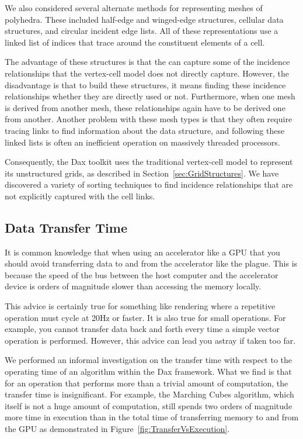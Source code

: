 We also considered several alternate methods for representing meshes of
polyhedra. These included half-edge and winged-edge
structures, cellular data
structures, and circular incident edge
lists. All of these representations use a linked list of
indices that trace around the constituent elements of a cell.

The advantage of these structures is that the can capture some of the
incidence relationships that the vertex-cell model does not directly
capture. However, the disadvantage is that to build these structures, it
means finding these incidence relationships whether they are directly used
or not. Furthermore, when one mesh is derived from another mesh, these
relationships again have to be derived one from another. Another problem
with these mesh types is that they often require tracing links to find
information about the data structure, and following these linked lists is
often an inefficient operation on massively threaded processors.

Consequently, the Dax toolkit uses the traditional vertex-cell model to
represent its unstructured grids, as described in
Section~\ref{sec:GridStructures}. We have discovered a variety of sorting
techniques to find incidence relationships that are not explicitly captured
with the cell links.

\subsection{Data Transfer Time}

It is common knowledge that when using an accelerator like a GPU that you
should avoid transferring data to and from the accelerator like the
plague. This is because the speed of the bus between the host computer and
the accelerator device is orders of magnitude slower than accessing the
memory locally.

This advice is certainly true for something like rendering where a
repetitive operation must cycle at 20Hz or faster. It is also true for
small operations. For example, you cannot transfer data back and forth
every time a simple vector operation is performed. However, this advice can
lead you astray if taken too far.

We performed an informal investigation on the transfer time with respect to
the operating time of an algorithm within the Dax framework. What we find
is that for an operation that performs more than a trivial amount of
computation, the transfer time is insignificant. For example, the Marching
Cubes algorithm, which itself is not a huge amount of computation, still
spends two orders of magnitude more time in execution than in the total
time of transferring memory to and from the GPU as demonstrated in
Figure~\ref{fig:TransferVsExecution}.

